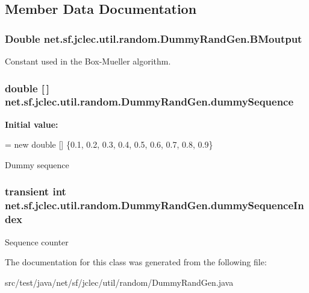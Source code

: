 \subsection{Member Data Documentation}
\hypertarget{classnet_1_1sf_1_1jclec_1_1util_1_1random_1_1_dummy_rand_gen_a5c42bd5cadb8dd6471441d1f85665d56}{
\subsubsection[{B\-Moutput}]{\setlength{\rightskip}{0pt plus 5cm}Double net.\-sf.\-jclec.\-util.\-random.\-Dummy\-Rand\-Gen.\-B\-Moutput\hspace{0.3cm}{\ttfamily [protected]}}}\label{classnet_1_1sf_1_1jclec_1_1util_1_1random_1_1_dummy_rand_gen_a5c42bd5cadb8dd6471441d1f85665d56}
Constant used in the Box-\/\-Mueller algorithm. \hypertarget{classnet_1_1sf_1_1jclec_1_1util_1_1random_1_1_dummy_rand_gen_a1b46d8d65c07d375a79cb47e93047bde}{
\subsubsection[{dummy\-Sequence}]{\setlength{\rightskip}{0pt plus 5cm}double \mbox{[}$\,$\mbox{]} net.\-sf.\-jclec.\-util.\-random.\-Dummy\-Rand\-Gen.\-dummy\-Sequence\hspace{0.3cm}{\ttfamily [protected]}}}\label{classnet_1_1sf_1_1jclec_1_1util_1_1random_1_1_dummy_rand_gen_a1b46d8d65c07d375a79cb47e93047bde}
{\bfseries Initial value\-:}
\begin{DoxyCode}
= 
        \textcolor{keyword}{new} \textcolor{keywordtype}{double} [] \{0.1, 0.2, 0.3, 0.4, 0.5, 0.6, 0.7, 0.8, 0.9\}
\end{DoxyCode}
Dummy sequence \hypertarget{classnet_1_1sf_1_1jclec_1_1util_1_1random_1_1_dummy_rand_gen_ad14fb3cc2b1564fd4358239aa06dca1d}{
\subsubsection[{dummy\-Sequence\-Index}]{\setlength{\rightskip}{0pt plus 5cm}transient int net.\-sf.\-jclec.\-util.\-random.\-Dummy\-Rand\-Gen.\-dummy\-Sequence\-Index\hspace{0.3cm}{\ttfamily [protected]}}}\label{classnet_1_1sf_1_1jclec_1_1util_1_1random_1_1_dummy_rand_gen_ad14fb3cc2b1564fd4358239aa06dca1d}
Sequence counter 

The documentation for this class was generated from the following file\-:\begin{DoxyCompactItemize}
\item 
src/test/java/net/sf/jclec/util/random/Dummy\-Rand\-Gen.\-java\end{DoxyCompactItemize}
